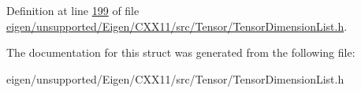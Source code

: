 Definition at line \hyperlink{eigen_2unsupported_2_eigen_2_c_x_x11_2src_2_tensor_2_tensor_dimension_list_8h_source_l00199}{199} of file \hyperlink{eigen_2unsupported_2_eigen_2_c_x_x11_2src_2_tensor_2_tensor_dimension_list_8h_source}{eigen/unsupported/\+Eigen/\+C\+X\+X11/src/\+Tensor/\+Tensor\+Dimension\+List.\+h}.



The documentation for this struct was generated from the following file\+:\begin{DoxyCompactItemize}
\item 
eigen/unsupported/\+Eigen/\+C\+X\+X11/src/\+Tensor/\+Tensor\+Dimension\+List.\+h\end{DoxyCompactItemize}
